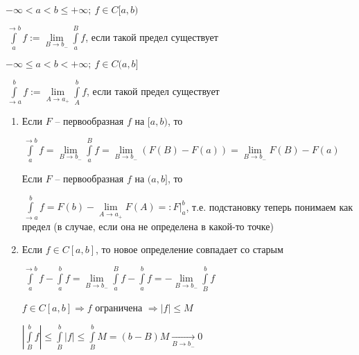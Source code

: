 \documentclass[12pt]{article}
\begin{document}
\begin{defin}{}
    $- \infty < a < b \leq + \infty;\ f \in C[a, b)$

    $\int\limits_a^{\to b} f := \lim\limits_{B \to b_-} \int\limits_a^B f$, если такой предел существует

    $- \infty \leq a < b < + \infty;\ f \in C(a, b]$

    $\int\limits_{\to a}^b f := \lim\limits_{A \to a_+} \int\limits_A^b f$, если такой предел существует
\end{defin}

\begin{Remark}{}
    \begin{enumerate}
        \item Если $F$ -- первообразная $f$ на $[a, b)$, то 
        
        $\int\limits_a^{\to b} f = \lim\limits_{B \to b_-} \int\limits_a^B f = \lim\limits_{B \to b_-} (F(B) - F(a)) = \lim\limits_{B \to b_-} F(B) - F(a)$

        Если $F$ -- первообразная $f$ на $(a, b]$, то

        $\int\limits_{\to a}^b f = F(b) - \lim\limits_{A \to a_+} F(A) =: F|_a^b$, т.е. подстановку теперь понимаем как предел (в случае, если она не определена в какой-то точке)

        \item Если $f \in C[a, b]$, то новое определение совпадает со старым
        
        $\int\limits_a^{\to b} f - \int\limits_a^b f = \lim\limits_{B \to b_-} \int\limits_a^B f - \int\limits_a^b f = -\lim\limits_{B \to b_-} \int\limits_B^b f$

        $f \in C[a, b] \Rightarrow f$ ограничена $\Rightarrow |f| \leq M$

        $|\int\limits_B^b f| \leq \int\limits_B^b |f| \leq \int\limits_B^b M = (b - B)M \xrightarrow[B \to b_-]{} 0$
    \end{enumerate}
\end{Remark}
\end{document}
